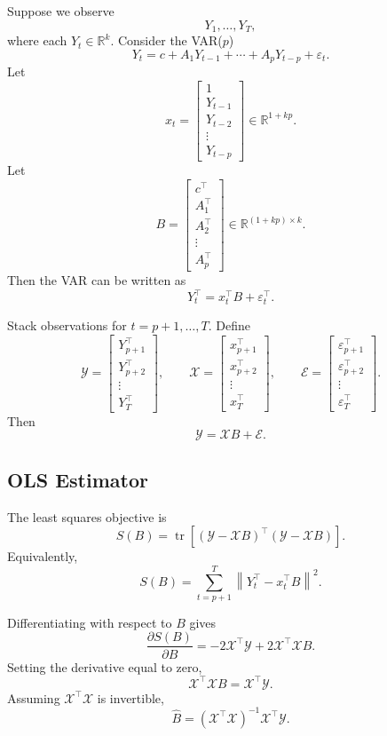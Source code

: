 \documentclass[12pt,oneside]{book}
\numberwithin{equation}{section}
\theoremstyle{definition}
\theoremstyle{plain}
\theoremstyle{remark}
\newcommand{\R}{\mathbb{R}}
\newcommand{\norm}[1]{\left\lVert #1 \right\rVert}
\newcommand{\tr}{\operatorname{tr}}
\begin{document}
Suppose we observe
\[
Y_1,\ldots,Y_T,
\]
where each $Y_t\in\R^k$. Consider the VAR($p$)
\[
Y_t=c+A_1Y_{t-1}+\cdots+A_pY_{t-p}+\varepsilon_t.
\]
Let
\[
x_t=
\begin{bmatrix}
1\\
Y_{t-1}\\
Y_{t-2}\\
\vdots\\
Y_{t-p}
\end{bmatrix}
\in \R^{1+kp}.
\]
Let
\[
B=
\begin{bmatrix}
c^\top\\
A_1^\top\\
A_2^\top\\
\vdots\\
A_p^\top
\end{bmatrix}
\in \R^{(1+kp)\times k}.
\]
Then the VAR can be written as
\[
Y_t^\top=x_t^\top B+\varepsilon_t^\top.
\]

Stack observations for $t=p+1,\ldots,T$. Define
\[
\mathcal{Y}
=
\begin{bmatrix}
Y_{p+1}^\top\\
Y_{p+2}^\top\\
\vdots\\
Y_T^\top
\end{bmatrix},
\qquad
\mathcal{X}
=
\begin{bmatrix}
x_{p+1}^\top\\
x_{p+2}^\top\\
\vdots\\
x_T^\top
\end{bmatrix},
\qquad
\mathcal{E}
=
\begin{bmatrix}
\varepsilon_{p+1}^\top\\
\varepsilon_{p+2}^\top\\
\vdots\\
\varepsilon_T^\top
\end{bmatrix}.
\]
Then
\[
\mathcal{Y}=\mathcal{X}B+\mathcal{E}.
\]

\subsection{OLS Estimator}

The least squares objective is
\[
S(B)
=
\tr\left[
(\mathcal{Y}-\mathcal{X}B)^\top
(\mathcal{Y}-\mathcal{X}B)
\right].
\]
Equivalently,
\[
S(B)
=
\sum_{t=p+1}^T
\norm{Y_t^\top-x_t^\top B}^2.
\]

Differentiating with respect to $B$ gives
\[
\frac{\partial S(B)}{\partial B}
=
-2\mathcal{X}^\top\mathcal{Y}
+
2\mathcal{X}^\top\mathcal{X}B.
\]
Setting the derivative equal to zero,
\[
\mathcal{X}^\top\mathcal{X}B
=
\mathcal{X}^\top\mathcal{Y}.
\]
Assuming $\mathcal{X}^\top\mathcal{X}$ is invertible,
\[
\widehat{B}
=
(\mathcal{X}^\top\mathcal{X})^{-1}\mathcal{X}^\top\mathcal{Y}.
\]
\end{document}
